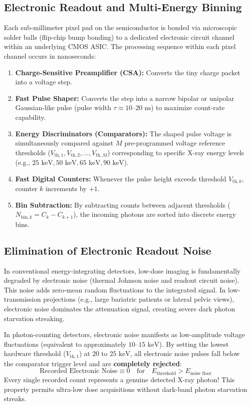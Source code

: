 \documentclass[11pt,a4paper]{article}
\begin{document}
\subsection{Electronic Readout and Multi-Energy Binning}
Each sub-millimeter pixel pad on the semiconductor is bonded via microscopic solder balls (flip-chip bump bonding) to a dedicated electronic circuit channel within an underlying CMOS ASIC. The processing sequence within each pixel channel occurs in nanoseconds:
\begin{enumerate}
    \item \textbf{Charge-Sensitive Preamplifier (CSA):} Converts the tiny charge packet into a voltage step.
    \item \textbf{Fast Pulse Shaper:} Converts the step into a narrow bipolar or unipolar Gaussian-like pulse (pulse width $\tau \approx 10\text{--}20\text{ ns}$) to maximize count-rate capability.
    \item \textbf{Energy Discriminators (Comparators):} The shaped pulse voltage is simultaneously compared against $M$ pre-programmed voltage reference thresholds ($V_{\text{th}, 1}, V_{\text{th}, 2}, \dots, V_{\text{th}, M}$) corresponding to specific X-ray energy levels (e.g., $25\text{ keV}, 50\text{ keV}, 65\text{ keV}, 90\text{ keV}$).
    \item \textbf{Fast Digital Counters:} Whenever the pulse height exceeds threshold $V_{\text{th}, k}$, counter $k$ increments by $+1$.
    \item \textbf{Bin Subtraction:} By subtracting counts between adjacent thresholds ($N_{\text{bin}, k} = C_k - C_{k+1}$), the incoming photons are sorted into discrete energy bins.
\end{enumerate}

\subsection{Elimination of Electronic Readout Noise}
In conventional energy-integrating detectors, low-dose imaging is fundamentally degraded by electronic noise (thermal Johnson noise and readout circuit noise). This noise adds zero-mean random fluctuations to the integrated signal. In low-transmission projections (e.g., large bariatric patients or lateral pelvic views), electronic noise dominates the attenuation signal, creating severe dark photon starvation streaking.

In photon-counting detectors, electronic noise manifests as low-amplitude voltage fluctuations (equivalent to approximately $10\text{--}15\text{ keV}$). By setting the lowest hardware threshold ($V_{\text{th}, 1}$) at \textbf{$20\text{ to }25\text{ keV}$}, all electronic noise pulses fall below the comparator trigger level and are \textbf{completely rejected}:
\begin{equation}
    \text{Recorded Electronic Noise} \equiv 0 \quad \text{for} \quad E_{\text{threshold}} > E_{\text{noise floor}}
\end{equation}
Every single recorded count represents a genuine detected X-ray photon! This property permits ultra-low dose acquisitions without dark-band photon starvation streaks.
\end{document}
